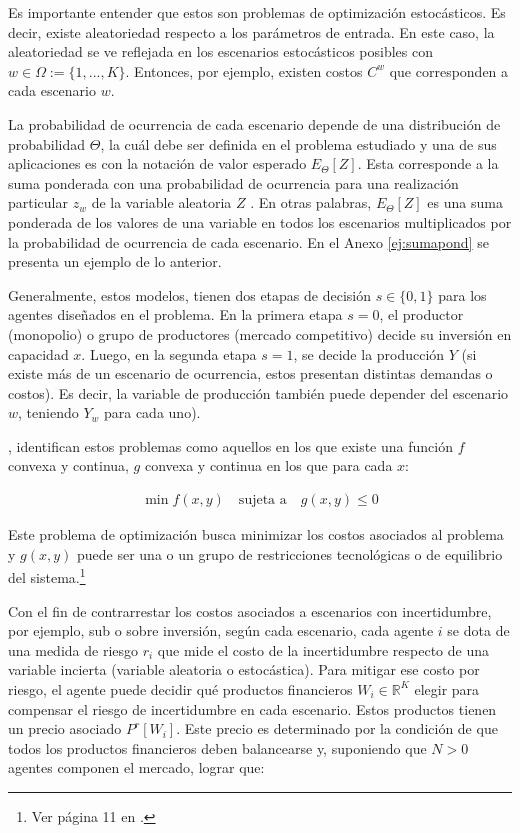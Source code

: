 Es importante entender que estos son problemas de optimización estocásticos. Es decir, existe aleatoriedad respecto a los parámetros de entrada. En este caso, la aleatoriedad se ve reflejada en los escenarios estocásticos posibles con $w \in \Omega:=\{1,...,K\}$. Entonces, por ejemplo, existen costos $C^{w}$ que corresponden a cada escenario $w$. 
\vspace{2.5mm}

La probabilidad de ocurrencia de cada escenario depende de una distribución de probabilidad $\Theta$, la cuál debe ser definida en el problema estudiado y una de sus aplicaciones es con la notación de valor esperado $E_{\Theta}[Z]$. Esta corresponde a la suma ponderada con una probabilidad de ocurrencia para una realización particular $z_{w}$ de la variable aleatoria $Z$ . En otras palabras, $E_{\Theta}[Z]$ es una suma ponderada de los valores de una variable en todos los escenarios multiplicados por la probabilidad de ocurrencia de cada escenario. En el Anexo \ref{ej:sumapond} se presenta un ejemplo de lo anterior.
\vspace{2.5mm}

Generalmente, estos modelos, tienen dos etapas de decisión $s\in\{0,1\}$ para los agentes diseñados en el problema. En la primera etapa $s=0$, el productor (monopolio) o grupo de productores (mercado competitivo) decide su inversión en capacidad $x$. Luego, en la segunda etapa $s=1$, se decide la producción $Y$ (si existe más de un escenario de ocurrencia, estos presentan distintas demandas o costos). Es decir, la variable de producción también puede depender del escenario $w$, teniendo $Y_{w}$ para cada uno).
\vspace{2.5mm}

 , identifican estos problemas como aquellos en los que existe una función $f$ convexa y continua, $g$ convexa y continua en los que para cada $x$:

\begin{align}
\min f(x,y)\quad\text{sujeta a}\quad g(x,y)\leq 0
\end{align}


Este problema de optimización busca minimizar los costos asociados al problema y $g(x,y)$ puede ser una o un grupo de restricciones tecnológicas o de equilibrio del sistema.\footnote{Ver página 11 en .} 
\vspace{2.5mm}

Con el fin de contrarrestar los costos asociados a escenarios con incertidumbre, por ejemplo, sub o sobre inversión, según cada escenario, cada agente $i$ se dota de una medida de riesgo $r_{i}$ que mide el costo de la incertidumbre respecto de una variable incierta (variable aleatoria o estocástica). Para mitigar ese costo por riesgo, el agente puede decidir qué productos financieros $W_i\in\mathbb{R}^K$ elegir para compensar el riesgo de incertidumbre en cada escenario. Estos productos tienen un precio asociado $P^{r}[W_i]$. Este precio es determinado por la condición de que todos los productos financieros deben balancearse y, suponiendo que $N>0$ agentes componen el mercado, lograr que:

